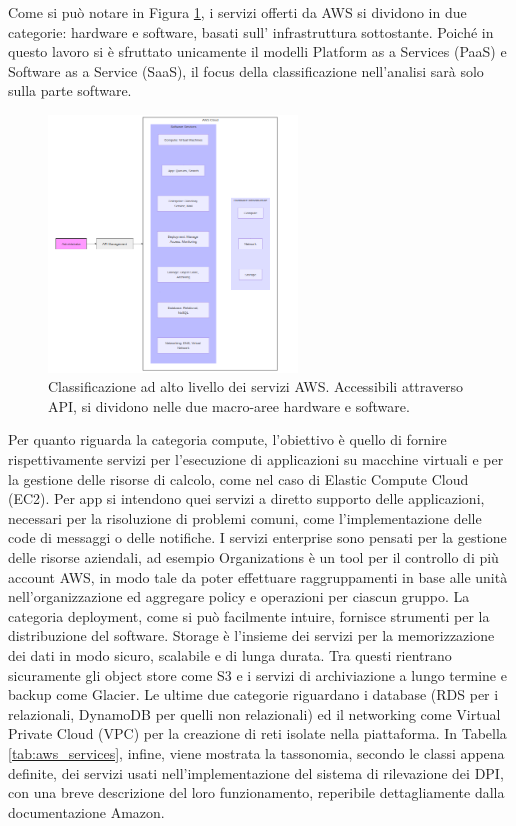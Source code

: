 Come si può notare in Figura \ref{fig:services_taxonomy}, i servizi offerti da AWS si dividono in due categorie: hardware e software, basati sull' infrastruttura sottostante\cite{a12AWSinAction}. Poiché in questo lavoro si è sfruttato unicamente il modelli Platform as a Services (PaaS) e Software as a Service (SaaS), 
il focus della classificazione nell'analisi sarà solo sulla parte software.
\begin{figure}[htbp]
    \centering
    \includegraphics[width=0.59\textwidth]{figures/aws_services_taxonomy.png}
    \caption{Classificazione ad alto livello dei servizi AWS. Accessibili attraverso API, si dividono nelle due macro-aree hardware e software.}
    \label{fig:services_taxonomy}
\end{figure}

Per quanto riguarda la categoria compute, l'obiettivo è quello di fornire rispettivamente servizi per l'esecuzione di applicazioni su macchine virtuali e per la gestione delle risorse di calcolo, come nel caso di Elastic Compute Cloud (EC2). Per app si intendono quei servizi a diretto supporto delle applicazioni, necessari per la risoluzione di problemi comuni, come l'implementazione delle code di messaggi o delle notifiche. I servizi enterprise sono pensati per la gestione delle risorse aziendali, ad esempio Organizations è un tool per il controllo di più account AWS, in modo tale da poter effettuare raggruppamenti in base alle unità nell'organizzazione ed aggregare policy e operazioni per ciascun gruppo. La categoria deployment, come si può facilmente intuire, fornisce strumenti per la distribuzione del software. Storage è l'insieme dei servizi per la memorizzazione dei dati in modo sicuro, scalabile e di lunga durata. Tra questi rientrano sicuramente gli object store come S3 e i servizi di archiviazione a lungo termine e backup come Glacier. Le ultime due categorie riguardano i database (RDS per i relazionali, DynamoDB per quelli non relazionali) ed il networking come Virtual Private Cloud (VPC) per la creazione di reti isolate nella piattaforma. %
In Tabella \ref{tab:aws_services}, infine, viene mostrata la tassonomia, secondo le classi appena definite, dei servizi usati nell'implementazione del sistema di rilevazione dei DPI, con una breve descrizione del loro funzionamento, reperibile dettagliamente dalla documentazione Amazon\cite{a13AWSDoc}. 

